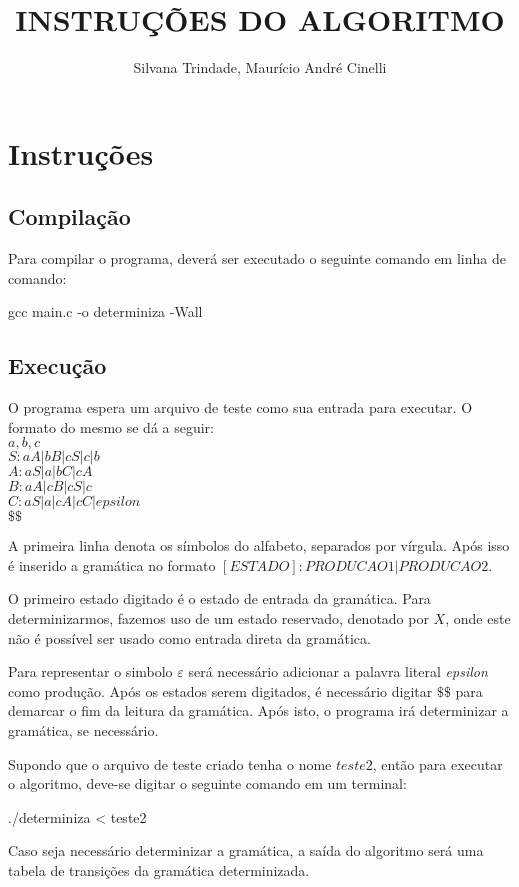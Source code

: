 \documentclass[10pt,a4paper,titlepage]{coursepaper}
\author{Silvana Trindade, Maurício André Cinelli}
\title{INSTRUÇÕES DO ALGORITMO}
\begin{document}
\maketitle

\section *{Instruções}

\subsection *{Compilação}

Para compilar o programa, deverá ser executado o seguinte comando em linha de comando:

\begin{center}
gcc main.c -o determiniza -Wall
\end{center}

\subsection *{Execução}

O programa espera um arquivo de teste como sua entrada para executar.
O formato do mesmo se dá a seguir:\\
$a,b,c$\\
$S:aA|bB|cS|c|b$\\
$A:aS|a|bC|cA$\\
$B:aA|cB|cS|c$\\
$C:aS|a|cA|cC|epsilon$\\
$\$\$$


A primeira linha denota os símbolos do alfabeto, separados por vírgula.
Após isso é inserido a gramática no formato $[ESTADO]:PRODUCAO1|PRODUCAO2$.

O primeiro estado digitado é o estado de entrada da gramática.
Para determinizarmos, fazemos uso de um estado reservado, denotado por $X$, onde este não é possível ser usado como entrada direta da gramática.

Para representar o simbolo $\varepsilon$  será necessário adicionar a palavra literal \textit{epsilon} como produção.
Após os estados serem digitados, é necessário digitar $\$\$$ para demarcar o fim
da leitura da gramática.
Após isto, o programa irá determinizar a gramática, se necessário.

Supondo que o arquivo de teste criado tenha o nome $teste2$, então para executar o algoritmo, deve-se digitar o seguinte comando em um terminal:

\begin{center}
./determiniza < teste2
\end{center}

Caso seja necessário determinizar a gramática, a saída do algoritmo será uma tabela de transições da gramática determinizada.
\end{document}

